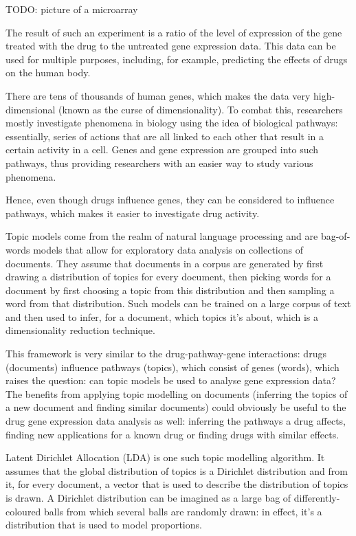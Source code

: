 \documentclass[12pt,a4paper,twoside,openright]{report}
\begin{document}
TODO: picture of a microarray

The result of such an experiment is a ratio of the level of expression of the gene treated with the drug to the untreated gene expression data. This data can be used for multiple purposes, including, for example, predicting the effects of drugs on the human body.

There are tens of thousands of human genes, which makes the data very high-dimensional (known as the curse of dimensionality). To combat this, researchers mostly investigate phenomena in biology using the idea of biological pathways: essentially, series of actions that are all linked to each other that result in a certain activity in a cell. Genes and gene expression are grouped into such pathways, thus providing researchers with an easier way to study various phenomena.

Hence, even though drugs influence genes, they can be considered to influence pathways, which makes it easier to investigate drug activity.

Topic models come from the realm of natural language processing and are bag-of-words models that allow for exploratory data analysis on collections of documents. They assume that documents in a corpus are generated by first drawing a distribution of topics for every document, then picking words for a document by first choosing a topic from this distribution and then sampling a word from that distribution. Such models can be trained on a large corpus of text and then used to infer, for a document, which topics it's about, which is a dimensionality reduction technique.

This framework is very similar to the drug-pathway-gene interactions: drugs (documents) influence pathways (topics), which consist of genes (words), which raises the question: can topic models be used to analyse gene expression data? The benefits from applying topic modelling on documents (inferring the topics of a new document and finding similar documents) could obviously be useful to the drug gene expression data analysis as well: inferring the pathways a drug affects, finding new applications for a known drug or finding drugs with similar effects.

Latent Dirichlet Allocation (LDA) \cite{Blei} is one such topic modelling algorithm. It assumes that the global distribution of topics is a Dirichlet distribution and from it, for every document, a vector that is used to describe the distribution of topics is drawn. A Dirichlet distribution can be imagined as a large bag of differently-coloured balls from which several balls are randomly drawn: in effect, it's a distribution that is used to model proportions.
\end{document}
